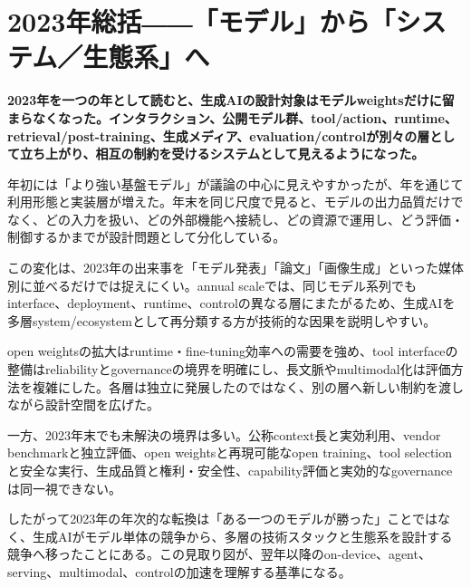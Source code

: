 \section{2023年総括――「モデル」から「システム／生態系」へ}
\label{pkg:annual-synthesis}
\noindent\textbf{2023年を一つの年として読むと、生成AIの設計対象はモデルweightsだけに留まらなくなった。インタラクション、公開モデル群、tool/action、runtime、retrieval/post-training、生成メディア、evaluation/controlが別々の層として立ち上がり、相互の制約を受けるシステムとして見えるようになった。}

年初には「より強い基盤モデル」が議論の中心に見えやすかったが、年を通じて利用形態と実装層が増えた。年末を同じ尺度で見ると、モデルの出力品質だけでなく、どの入力を扱い、どの外部機能へ接続し、どの資源で運用し、どう評価・制御するかまでが設計問題として分化している。


この変化は、2023年の出来事を「モデル発表」「論文」「画像生成」といった媒体別に並べるだけでは捉えにくい。annual scaleでは、同じモデル系列でもinterface、deployment、runtime、controlの異なる層にまたがるため、生成AIを多層system/ecosystemとして再分類する方が技術的な因果を説明しやすい。


open weightsの拡大はruntime・fine-tuning効率への需要を強め、tool interfaceの整備はreliabilityとgovernanceの境界を明確にし、長文脈やmultimodal化は評価方法を複雑にした。各層は独立に発展したのではなく、別の層へ新しい制約を渡しながら設計空間を広げた。


一方、2023年末でも未解決の境界は多い。公称context長と実効利用、vendor benchmarkと独立評価、open weightsと再現可能なopen training、tool selectionと安全な実行、生成品質と権利・安全性、capability評価と実効的なgovernanceは同一視できない。


したがって2023年の年次的な転換は「ある一つのモデルが勝った」ことではなく、生成AIがモデル単体の競争から、多層の技術スタックと生態系を設計する競争へ移ったことにある。この見取り図が、翌年以降のon-device、agent、serving、multimodal、controlの加速を理解する基準になる。
